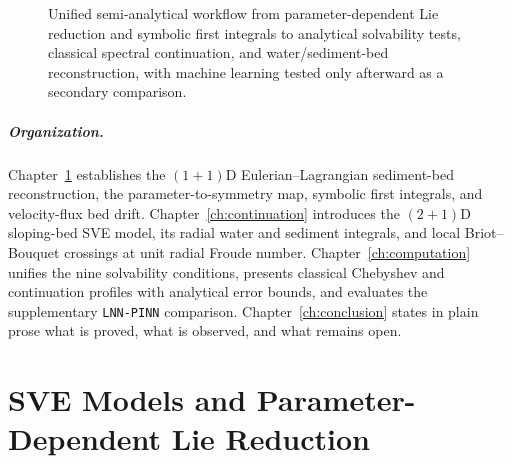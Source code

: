 \documentclass[12pt,a4paper,oneside]{report}
\numberwithin{equation}{chapter}
\theoremstyle{definition}
\theoremstyle{remark}\newtheorem{remark}[theorem]{Remark}
\begin{document}
\begin{figure}[!ht]
\caption[Unified semi-analytical workflow]{Unified semi-analytical workflow from parameter-dependent Lie reduction and symbolic first integrals to analytical solvability tests, classical spectral continuation, and water/sediment-bed reconstruction, with machine learning tested only afterward as a secondary comparison.}
\label{fig:workflow}
\end{figure}

\paragraph{Organization.}
Chapter~\ref{ch:models} establishes the $(1+1)$D Eulerian--Lagrangian sediment-bed reconstruction, the parameter-to-symmetry map, symbolic first integrals, and velocity-flux bed drift. Chapter~\ref{ch:continuation} introduces the $(2+1)$D sloping-bed SVE model, its radial water and sediment integrals, and local Briot--Bouquet crossings at unit radial Froude number. Chapter~\ref{ch:computation} unifies the nine solvability conditions, presents classical Chebyshev and continuation profiles with analytical error bounds, and evaluates the supplementary \texttt{LNN-PINN} comparison. Chapter~\ref{ch:conclusion} states in plain prose what is proved, what is observed, and what remains open.
\FloatBarrier

\chapter{SVE Models and Parameter-Dependent Lie Reduction}\label{ch:models}
\end{document}
